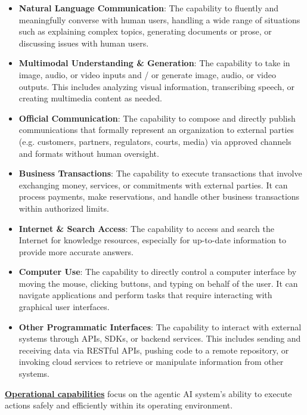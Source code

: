 \documentclass{article}
\begin{document}
\begin{itemize}
    \item \textbf{Natural Language Communication}: The capability to fluently and meaningfully converse with human users, handling a wide range of situations such as explaining complex topics, generating documents or prose, or discussing issues with human users.

    \item \textbf{Multimodal Understanding \& Generation}: The capability to take in image, audio, or video inputs and / or generate image, audio, or video outputs. This includes analyzing visual information, transcribing speech, or creating multimedia content as needed.

    \item \textbf{Official Communication}: The capability to compose and directly publish communications that formally represent an organization to external parties (e.g. customers, partners, regulators, courts, media) via approved channels and formats without human oversight. 

    \item \textbf{Business Transactions}: The capability to execute transactions that involve exchanging money, services, or commitments with external parties. It can process payments, make reservations, and handle other business transactions within authorized limits. 

    \item \textbf{Internet \& Search Access}: The capability to access and search the Internet for knowledge resources, especially for up-to-date information to provide more accurate answers. 

    \item \textbf{Computer Use}: The capability to directly control a computer interface by moving the mouse, clicking buttons, and typing on behalf of the user. It can navigate applications and perform tasks that require interacting with graphical user interfaces.

    \item \textbf{Other Programmatic Interfaces}: The capability to interact with external systems through APIs, SDKs, or backend services. This includes sending and receiving data via RESTful APIs, pushing code to a remote repository, or invoking cloud services to retrieve or manipulate information from other systems. 
    
\end{itemize}

\ul{\textbf{Operational capabilities}} focus on the agentic AI system's ability to execute actions safely and efficiently within its operating environment.
\end{document}
